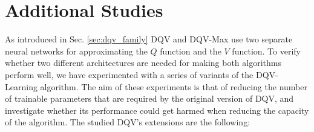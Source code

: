 





\section{Additional Studies}
\label{sec:ijcnn_additional_studies}

As introduced in Sec. \ref{sec:dqv_family} DQV and DQV-Max use two separate neural networks for approximating the $Q$ function and the $V$ function. To verify whether two different architectures are needed for making both algorithms perform well, we have experimented with a series of variants of the DQV-Learning algorithm. The aim of these experiments is that of reducing the number of trainable parameters that are required by the original version of DQV, and investigate whether its performance could get harmed when reducing the capacity of the algorithm. The studied DQV's extensions are the following:

